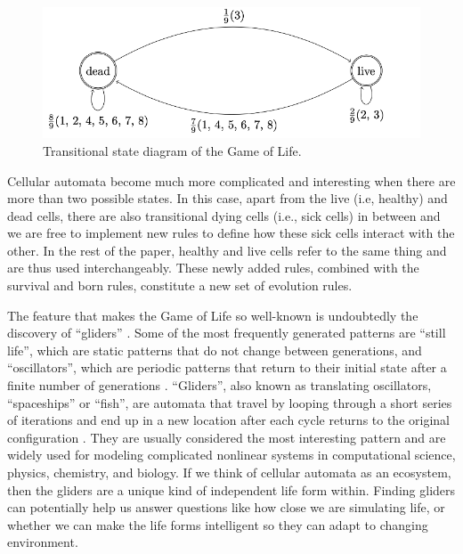 \documentclass[12pt]{article}
\numberwithin{figure}{section} %
\begin{document}
\begin{figure}[!htb]
\centering
\includegraphics[width=\linewidth]{Section1/3}
\caption{Transitional state diagram of the Game of Life.}
\label{fig:GOL diagram}
\end{figure}

Cellular automata become much more complicated and interesting when there are more than two possible states. In this case, apart from the live (i.e, healthy) and dead cells, there are also transitional dying cells (i.e., sick cells) in between and we are free to implement new rules to define how these sick cells interact with the other. In the rest of the paper, healthy and live cells refer to the same thing and are thus used interchangeably. These newly added rules, combined with the survival and born rules, constitute a new set of evolution rules. 

The feature that makes the Game of Life so well-known is undoubtedly the discovery of “gliders” \cite{Glider}. Some of the most frequently generated patterns are “still life”, which are static patterns that do not change between generations, and “oscillators”, which are periodic patterns that return to their initial state after a finite number of generations \cite{Cellular automaton}. “Gliders”, also known as translating oscillators, “spaceships” or “fish”, are automata that travel by looping through a short series of iterations and end up in a new location after each cycle returns to the original configuration \cite{rake}. They are usually considered the most interesting pattern and are widely used for modeling complicated nonlinear systems in computational science, physics, chemistry, and biology. If we think of cellular automata as an ecosystem, then the gliders are a unique kind of independent life form within. Finding gliders can potentially help us answer questions like how close we are simulating life, or whether we can make the life forms intelligent so they can adapt to changing environment. 
\end{document}
